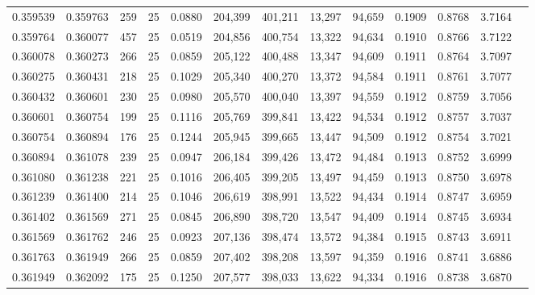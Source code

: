 \begin{tabular}{rrrrrrrrrrrrr}
0.359539 & 0.359763 &   259 &  25 &                                     0.0880 & 204,399 & 401,211 &  13,297 &  94,659 & 0.1909 & 0.8768 & 3.7164 \\
0.359764 & 0.360077 &   457 &  25 &                                     0.0519 & 204,856 & 400,754 &  13,322 &  94,634 & 0.1910 & 0.8766 & 3.7122 \\
0.360078 & 0.360273 &   266 &  25 &                                     0.0859 & 205,122 & 400,488 &  13,347 &  94,609 & 0.1911 & 0.8764 & 3.7097 \\
0.360275 & 0.360431 &   218 &  25 &                                     0.1029 & 205,340 & 400,270 &  13,372 &  94,584 & 0.1911 & 0.8761 & 3.7077 \\
0.360432 & 0.360601 &   230 &  25 &                                     0.0980 & 205,570 & 400,040 &  13,397 &  94,559 & 0.1912 & 0.8759 & 3.7056 \\
0.360601 & 0.360754 &   199 &  25 &                                     0.1116 & 205,769 & 399,841 &  13,422 &  94,534 & 0.1912 & 0.8757 & 3.7037 \\
0.360754 & 0.360894 &   176 &  25 &                                     0.1244 & 205,945 & 399,665 &  13,447 &  94,509 & 0.1912 & 0.8754 & 3.7021 \\
0.360894 & 0.361078 &   239 &  25 &                                     0.0947 & 206,184 & 399,426 &  13,472 &  94,484 & 0.1913 & 0.8752 & 3.6999 \\
0.361080 & 0.361238 &   221 &  25 &                                     0.1016 & 206,405 & 399,205 &  13,497 &  94,459 & 0.1913 & 0.8750 & 3.6978 \\
0.361239 & 0.361400 &   214 &  25 &                                     0.1046 & 206,619 & 398,991 &  13,522 &  94,434 & 0.1914 & 0.8747 & 3.6959 \\
0.361402 & 0.361569 &   271 &  25 &                                     0.0845 & 206,890 & 398,720 &  13,547 &  94,409 & 0.1914 & 0.8745 & 3.6934 \\
0.361569 & 0.361762 &   246 &  25 &                                     0.0923 & 207,136 & 398,474 &  13,572 &  94,384 & 0.1915 & 0.8743 & 3.6911 \\
0.361763 & 0.361949 &   266 &  25 &                                     0.0859 & 207,402 & 398,208 &  13,597 &  94,359 & 0.1916 & 0.8741 & 3.6886 \\
0.361949 & 0.362092 &   175 &  25 &                                     0.1250 & 207,577 & 398,033 &  13,622 &  94,334 & 0.1916 & 0.8738 & 3.6870 \\

\end{tabular}
